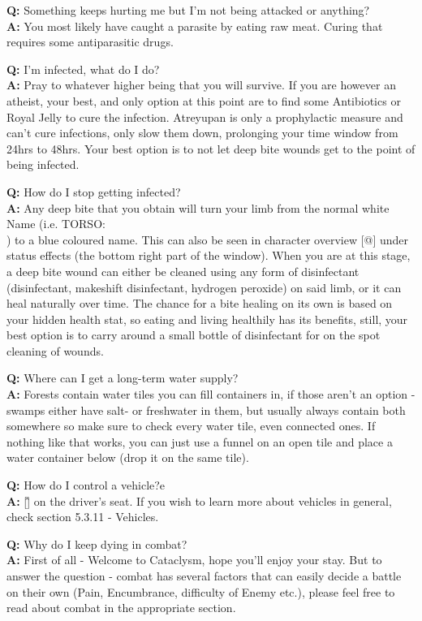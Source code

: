 \documentclass[11pt]{report}
\begin{document}
\textbf{Q:} Something keeps hurting me but I'm not being attacked or anything?\\
\textbf{A:} You most likely have caught a parasite by eating raw meat. Curing that requires some antiparasitic drugs.

\textbf{Q:} I'm infected, what do I do?\\
\textbf{A:} Pray to whatever higher being that you will survive. If you are however an atheist, your best, and only option at this point are to find some Antibiotics or Royal Jelly to cure the infection. Atreyupan is only a prophylactic measure and can't cure infections, only slow them down, prolonging your time window from 24hrs to 48hrs. Your best option is to not let deep bite wounds get to the point of being infected.

\textbf{Q:} How do I stop getting infected?\\
\textbf{A:} Any deep bite that you obtain will turn your limb from the normal white Name (i.e. TORSO: \textbar\textbar\textbar\textbar\\) to a blue coloured name. This can also be seen in character overview [@] under status effects (the bottom right part of the window). When you are at this stage, a deep bite wound can either be cleaned using any form of disinfectant (disinfectant, makeshift disinfectant, hydrogen peroxide) on said limb, or it can heal naturally over time. The chance for a bite healing on its own is based on your hidden health stat, so eating and living healthily has its benefits, still, your best option is to carry around a small bottle of disinfectant for on the spot cleaning of wounds.

\textbf{Q:} Where can I get a long-term water supply?\\
\textbf{A:} Forests contain water tiles you can fill containers in, if those aren't an option - swamps either have salt- or freshwater in them, but usually always contain both somewhere so make sure to check every water tile, even connected ones. If nothing like that works, you can just use a funnel on an open tile and place a water container below (drop it on the same tile).

\textbf{Q:} How do I control a vehicle?e\\
\textbf{A:} [\^] on the driver's seat. If you wish to learn more about vehicles in general, check section 5.3.11 - Vehicles.

\textbf{Q:} Why do I keep dying in combat?\\
\textbf{A:} First of all - Welcome to Cataclysm, hope you'll enjoy your stay. But to answer the question - combat has several factors that can easily decide a battle on their own (Pain, Encumbrance, difficulty of Enemy etc.), please feel free to read about combat in the appropriate section.
\end{document}
